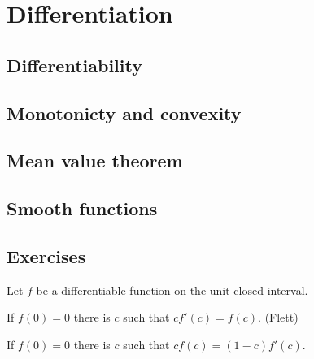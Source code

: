 \documentclass{../../large}
\begin{document}
\chapter{Differentiation}
\section{Differentiability}
\begin{prb}
\end{prb}

\section{Monotonicty and convexity}

\section{Mean value theorem}
\begin{prb}
\end{prb}
\section{Smooth functions}

\section*{Exercises}
\begin{prb}
Let $f$ be a differentiable function on the unit closed interval.
\begin{parts}
\item If $f(0)=0$ there is $c$ such that $cf'(c)=f(c)$. (Flett)
\item If $f(0)=0$ there is $c$ such that $cf(c)=(1-c)f'(c)$.
\end{parts}
\end{prb}
\begin{prb}
\end{prb}
\begin{prb}
\end{prb}
\end{document}
